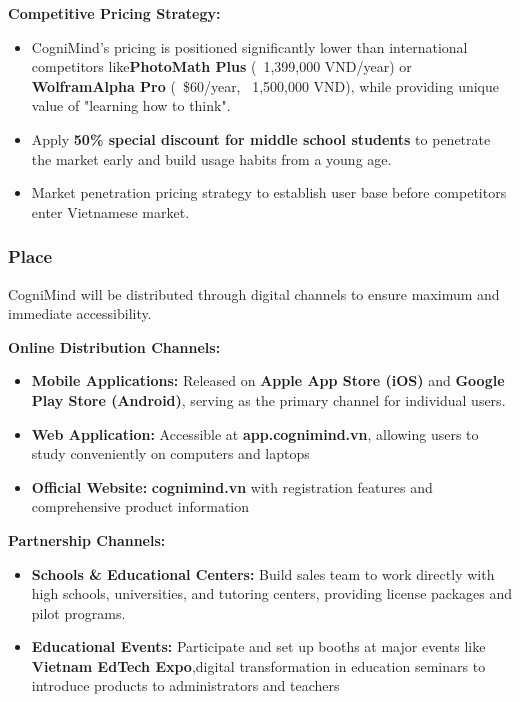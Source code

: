 \textbf{Competitive Pricing Strategy:}
\begin{itemize}
    \item   
        CogniMind's pricing is positioned significantly lower than international competitors like\textbf{PhotoMath Plus}
        (~1,399,000 VND/year) or \textbf{WolframAlpha Pro} (~\$60/year, ~1,500,000 VND), while providing unique value of
        "learning how to think".
    \item
        Apply \textbf{50\% special discount for middle school students} to penetrate the market early and build usage
        habits from a young age.
    \item Market penetration pricing strategy to establish user base before competitors enter Vietnamese market.
\end{itemize}

\subsubsection{Place}
CogniMind will be distributed through digital channels to ensure maximum and immediate accessibility.

\textbf{Online Distribution Channels:}
\begin{itemize}
    \item \textbf{Mobile Applications:} 
        Released on \textbf{Apple App Store (iOS)} and \textbf{Google Play Store (Android)}, serving as the primary
        channel for individual users.
    \item \textbf{Web Application:} 
        Accessible at \textbf{app.cognimind.vn}, allowing users to study conveniently on computers and laptops
    \item \textbf{Official Website:} \textbf{cognimind.vn} with registration features and comprehensive product information
\end{itemize}

\textbf{Partnership Channels:}
\begin{itemize}
    \item \textbf{Schools \& Educational Centers:}  
        Build sales team to work directly with high schools, universities, and tutoring centers, providing license
        packages and pilot programs.
    \item \textbf{Educational Events:} 
        Participate and set up booths at major events like \textbf{Vietnam EdTech Expo},digital transformation in
        education seminars to introduce products to administrators and teachers
\end{itemize}


